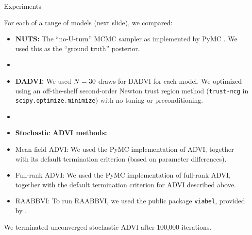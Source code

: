 \documentclass[8pt]{beamer}\usepackage[]{graphicx}\usepackage[]{color}
\begin{document}
\begin{frame}{Experiments}

For each of a range of models (next slide), we compared:

\begin{itemize}
    \item \textbf{NUTS:} The ``no-U-turn'' MCMC sampler as implemented by PyMC
    \citep{salvatier:2016:pymc3}.  We used this as the ``ground truth''
    posterior.
    \item[]
    \pause
    \item \textbf{DADVI:}  We used $N=30$ draws for DADVI for
    each model. We optimized using an off-the-shelf second-order Newton trust region
    method (\texttt{trust-ncg} in \texttt{scipy.optimize.minimize}) with no
    tuning or preconditioning.
    \pause
    \item[]
    \item[]\textbf{Stochastic ADVI methods:}
    \item Mean field ADVI: We used the PyMC implementation of
    ADVI, together with its default termination criterion (based on parameter
    differences). 
    \item Full-rank ADVI: We used the PyMC implementation of
    full-rank ADVI, together with the default termination criterion for ADVI
    described above.
    \item RAABBVI: To run RAABBVI, we used the public package
    \texttt{viabel}, provided
    by \citet{welandawe:2022:robustbbvi}.
    \end{itemize}

We terminated unconverged stochastic ADVI after 100,000 iterations.
    

\end{frame}


\end{document}
